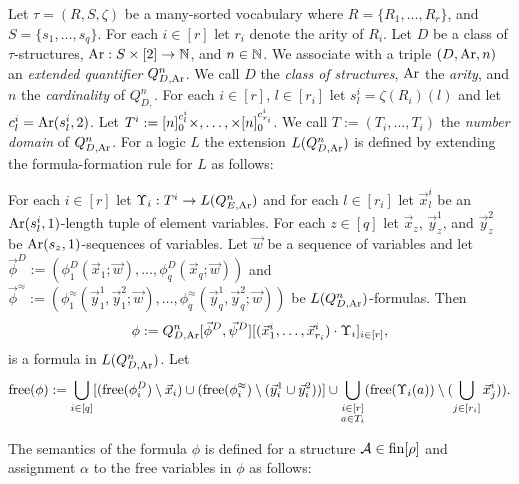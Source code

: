 \documentclass[../main/thesis.tex]{subfiles}
\begin{document}
Let $\tau = (R, S, \zeta)$ be a many-sorted vocabulary where $R = \{R_1, \ldots,
R_{r}\}$, and $S = \{s_1, \ldots, s_{q}\}$. For each $i \in [r]$ let $r_i$
denote the arity of $R_i$. Let $D$ be a class of $\tau$-structures, $\text{\upshape Ar} : S
\times [2] \rightarrow \mathbb{N}$, and $n \in \mathbb{N}$. We associate with a triple $(D, \text{\upshape Ar},
n)$ an \emph{extended quantifier} $Q^n_{D, \text{\upshape Ar}}$. We call $D$ the \emph{class of
  structures}, $\text{\upshape Ar}$ the \emph{arity}, and $n$ the \emph{cardinality} of
$Q^n_{D, }$. For each $i \in [r]$, $l \in [r_i]$ let $s^i_l = \zeta (R_i)(l)$
and let $c^i_l = \text{\upshape Ar}(s^i_l, 2)$. Let $T^i := [n]^{c^i_l}_0 \times ,
\ldots, \times [n]^{c^i_{r_i}}_0$. We call $T := (T_i, \ldots, T_i)$ the
\emph{number domain} of $Q^n_{D, \text{\upshape Ar}}$. For a logic $L$ the extension
$L(Q^{n}_{D, \text{\upshape Ar}})$ is defined by extending the formula-formation rule for $L$
as follows:
\begin{textbox}[13.8cm]
  For each $i \in [r]$ let $\Upsilon_i : T^i \rightarrow L(Q^{n}_{E, \text{\upshape Ar}})$ and for each
  $l \in [r_i]$ let $\vec{x}^i_l$ be an $\text{\upshape Ar}(s^i_l, 1)$-length tuple of element
  variables. For each $z \in [q]$ let $\vec{x}_z$, $\vec{y}^1_z$, and
  $\vec{y}^2_z$ be $\text{\upshape Ar}(s_z, 1)$-sequences of variables. Let $\vec{w}$ be a
  sequence of variables and let $\vec{\phi}^D := (\phi^D_1(\vec{x}_1; \vec{w}),
  \ldots, \phi^D_q(\vec{x}_q; \vec{w}))$ and $\vec{\phi}^\approx :=
  (\phi^\approx_1(\vec{y}^1_1, \vec{y}^2_1; \vec{w}), \ldots,
  \phi^{\approx}_q(\vec{y}^1_q, \vec{y}^2_q; \vec{w}))$ be $L(Q^{n}_{D,
    \text{\upshape Ar}})$-formulas. Then
  \begin{align*}
    \phi := Q^{n}_{D, \text{\upshape Ar}} [\vec{\phi}^D,
    \vec{\psi}^D][(\vec{x}^i_1, \ldots, \vec{x}^i_{r_i}) \cdot \Upsilon_i]_{i \in
    [r]},
  \end{align*}
  is a formula in $L(Q^{n}_{D, \text{\upshape Ar}})$. Let
  \begin{align*}
    \mathrm{free}(\phi) := \bigcup_{i \in [q]} [(\mathrm{free}(\phi^D_i) \setminus
    \vec{x}_i) \cup (\mathrm{free}(\phi^\approx_i) \setminus
    (\vec{y}^1_i \cup \vec{y}^2_i))] \cup \underset{\substack{i \in [r] \\ a \in T_i}}{\bigcup}(\mathrm{free}(\Upsilon_i(a)) \setminus (\bigcup_{j \in
    [r_i]}\vec{x}^i_j)).
  \end{align*}
\end{textbox}
The semantics of the formula $\phi$ is defined for a structure $\mathcal{A} \in
\text{\upshape fin}{[\rho]}$ and assignment $\alpha$ to the free variables in $\phi$ as follows:
\end{document}
